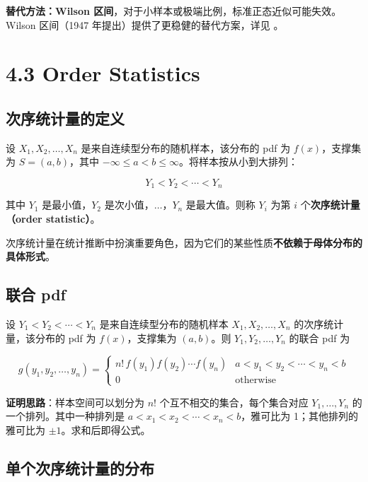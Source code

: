 \textbf{替代方法：Wilson 区间}，对于小样本或极端比例，标准正态近似可能失效。Wilson 区间（1947 年提出）提供了更稳健的替代方案，详见 \cite{Wilson1927}。

\section{4.3 Order Statistics}\label{sec:4.3}

\subsection{次序统计量的定义}

设 $X_1, X_2, \ldots, X_n$ 是来自连续型分布的随机样本，该分布的 pdf 为 $f(x)$，支撑集为 $S = (a, b)$，其中 $-\infty \leq a < b \leq \infty$。将样本按从小到大排列：

\[
Y_1 < Y_2 < \cdots < Y_n
\]

其中 $Y_1$ 是最小值，$Y_2$ 是次小值，$\ldots$，$Y_n$ 是最大值。则称 $Y_i$ 为第 $i$ 个\textbf{次序统计量（order statistic）}。

次序统计量在统计推断中扮演重要角色，因为它们的某些性质\textbf{不依赖于母体分布的具体形式}。

\subsection{联合 pdf}

\begin{theorem}[次序统计量的联合分布]\label{th:order-statistics-joint}
设 $Y_1 < Y_2 < \cdots < Y_n$ 是来自连续型分布的随机样本 $X_1, X_2, \ldots, X_n$ 的次序统计量，该分布的 pdf 为 $f(x)$，支撑集为 $(a, b)$。则 $Y_1, Y_2, \ldots, Y_n$ 的联合 pdf 为

\[
g(y_1, y_2, \ldots, y_n) =
\begin{cases}
n! \, f(y_1) f(y_2) \cdots f(y_n) & a < y_1 < y_2 < \cdots < y_n < b \\
0 & \text{otherwise}
\end{cases}
\label{eq:order-statistics-joint}
\]
\end{theorem}

\textbf{证明思路}：样本空间可以划分为 $n!$ 个互不相交的集合，每个集合对应 $Y_1, \ldots, Y_n$ 的一个排列。其中一种排列是 $a < x_1 < x_2 < \cdots < x_n < b$，雅可比为 1；其他排列的雅可比为 $\pm 1$。求和后即得公式。

\subsection{单个次序统计量的分布}

